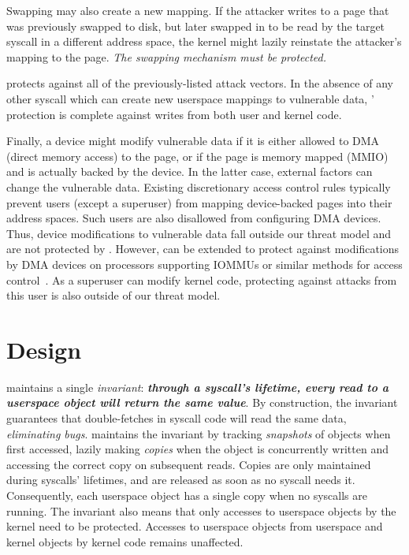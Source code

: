 \documentclass[letterpaper,twocolumn,10pt]{article}
\begin{document}
Swapping may also create a new mapping.
If the attacker writes to a page that was previously swapped
to disk, but later swapped in to be read by the target syscall in
a different address space, the kernel might lazily reinstate
the attacker's mapping to the page.
\emph{The swapping mechanism must be protected.}

\midas protects against all of the previously-listed attack vectors.
In the absence of any other syscall which can create new userspace
mappings to vulnerable data, \midas' protection is complete
against writes from both user and kernel code.

Finally, a device might modify vulnerable data if it is either
allowed to DMA (direct memory access) to the page, or if the page is memory 
mapped (MMIO) and is actually backed by the device.
In the latter case, external factors can change the vulnerable
data.
Existing discretionary access control rules typically prevent users
(except a superuser) from mapping device-backed pages into their
address spaces.
Such users are also disallowed from configuring DMA devices.
Thus, device modifications to vulnerable data fall outside
our threat model and are not protected by \midas.
However, \midas can be extended to protect against modifications by DMA devices
on processors supporting IOMMUs or similar methods for
access control~\cite{olsonbordercontrol}.
As a superuser can modify kernel code, protecting against attacks from this
user is also outside of our threat model.


\section{\midas Design}
\label{sec:design}

\midas maintains a single \emph{invariant}:
\textbf{\emph{through a syscall's lifetime, every read to a userspace object
will return the same value}}.
By construction, the invariant guarantees that double-fetches in syscall
code will read the same data, \emph{eliminating \tocttou bugs}.
\midas maintains the invariant by tracking \emph{snapshots} of objects
when first accessed, lazily making \emph{copies} when the object is concurrently
written and accessing the correct copy on subsequent reads.
Copies are only maintained during syscalls' lifetimes, and are released as
soon as no syscall needs it.
Consequently, each userspace object has a single copy when no syscalls are
running.
The invariant also means that only accesses to userspace objects by the kernel
need to be protected.
Accesses to userspace objects from userspace and kernel objects by kernel
code remains unaffected.
\end{document}
